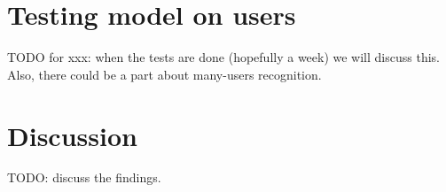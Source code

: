 
\section{Testing model on users}

TODO for xxx: when the tests are done (hopefully a week) we will discuss this. Also, there could be a part about many-users recognition.

\section{Discussion}
TODO: discuss the findings.